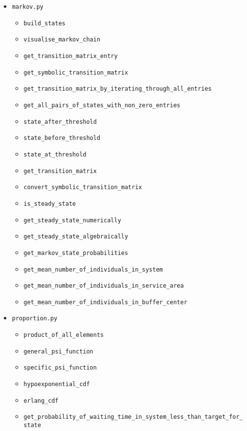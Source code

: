 \begin{itemize}
    \item \texttt{markov.py}
    \begin{itemize}
        \item \texttt{build\_states}
        \item \texttt{visualise\_markov\_chain}
        \item \texttt{get\_transition\_matrix\_entry}
        \item \texttt{get\_symbolic\_transition\_matrix}
        \item \texttt{get\_transition\_matrix\_by\_iterating\_through\_all\_entries}
        \item \texttt{get\_all\_pairs\_of\_states\_with\_non\_zero\_entries}
        \item \texttt{state\_after\_threshold}
        \item \texttt{state\_before\_threshold}
        \item \texttt{state\_at\_threshold}
        \item \texttt{get\_transition\_matrix}
        \item \texttt{convert\_symbolic\_transition\_matrix}
        \item \texttt{is\_steady\_state}
        \item \texttt{get\_steady\_state\_numerically}
        \item \texttt{get\_steady\_state\_algebraically}
        \item \texttt{get\_markov\_state\_probabilities}
        \item \texttt{get\_mean\_number\_of\_individuals\_in\_system}
        \item \texttt{get\_mean\_number\_of\_individuals\_in\_service\_area}
        \item \texttt{get\_mean\_number\_of\_individuals\_in\_buffer\_center}
    \end{itemize}
    \item \texttt{proportion.py}
    \begin{itemize}
        \item \texttt{product\_of\_all\_elements}
        \item \texttt{general\_psi\_function}
        \item \texttt{specific\_psi\_function}
        \item \texttt{hypoexponential\_cdf}
        \item \texttt{erlang\_cdf}
        \item \texttt{get\_probability\_of\_waiting\_time\_in\_system\_less\_than\_target\_for\_state}

\end{itemize}
\end{itemize}
